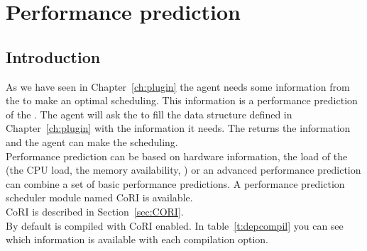 

\chapter{Performance prediction}
\label{chapter:performance}
\section{Introduction}

As we have seen in Chapter~\ref{ch:plugin} the agent needs some information
from the \sed to make an optimal scheduling. This information is a performance
prediction of the \sed. The agent will ask the \sed to fill the data structure
defined in Chapter~\ref{ch:plugin} with the information it needs. The \sed
returns the information and the agent can make the scheduling.\\ Performance
prediction can be based on hardware information, the load of the \sed (the CPU
load, the memory availability, \etc) or an advanced performance prediction can
combine a set of basic performance predictions. A performance prediction 
scheduler module named CoRI  is available.
\\CoRI is described in Section~\ref{sec:CORI}.\\
By default \diet is compiled with CoRI enabled.
In table~\ref{t:depcompil} you can see which
information is available with each compilation option.

